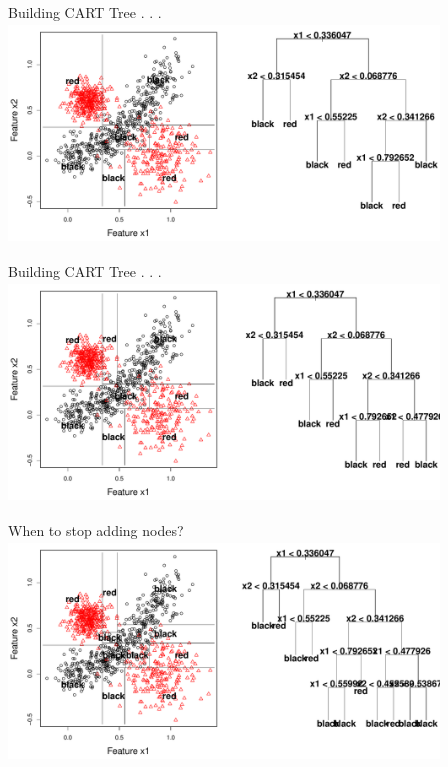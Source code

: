 \documentclass[12pt]{beamer}
\begin{document}
\begin{frame}{Building CART Tree . . .}
\includegraphics[height=2.3in,width=4.5in]{figs/tree_7.pdf}
\end{frame}

\begin{frame}{Building CART Tree . . .}
\includegraphics[height=2.3in,width=4.5in]{figs/tree_8.pdf}
\end{frame}




\begin{frame}{When to stop adding nodes?}
\includegraphics[height=2.3in,width=4.5in]{figs/tree_11.pdf}
\end{frame}
\end{document}
